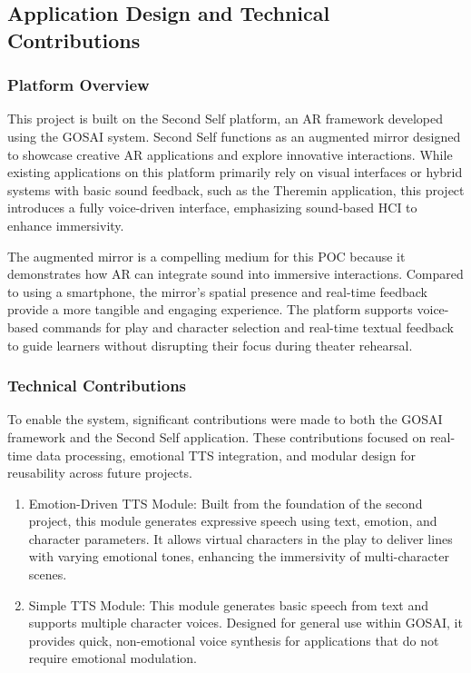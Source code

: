 \subsection{Application Design and Technical Contributions}
\subsubsection{Platform Overview}

This project is built on the Second Self platform, an AR framework developed using the GOSAI system. Second Self functions as an augmented mirror designed to showcase creative AR applications and explore innovative interactions. While existing applications on this platform primarily rely on visual interfaces or hybrid systems with basic sound feedback, such as the Theremin application, this project introduces a fully voice-driven interface, emphasizing sound-based HCI to enhance immersivity.

The augmented mirror is a compelling medium for this POC because it demonstrates how AR can integrate sound into immersive interactions. Compared to using a smartphone, the mirror's spatial presence and real-time feedback provide a more tangible and engaging experience. The platform supports voice-based commands for play and character selection and real-time textual feedback to guide learners without disrupting their focus during theater rehearsal.

\subsubsection{Technical Contributions}

To enable the system, significant contributions were made to both the GOSAI framework and the Second Self application. These contributions focused on real-time data processing, emotional TTS integration, and modular design for reusability across future projects.

\begin{enumerate}
\item Emotion-Driven TTS Module: Built from the foundation of the second project, this module generates expressive speech using text, emotion, and character parameters. It allows virtual characters in the play to deliver lines with varying emotional tones, enhancing the immersivity of multi-character scenes.
\item Simple TTS Module: This module generates basic speech from text and supports multiple character voices. Designed for general use within GOSAI, it provides quick, non-emotional voice synthesis for applications that do not require emotional modulation.
\end{enumerate}

